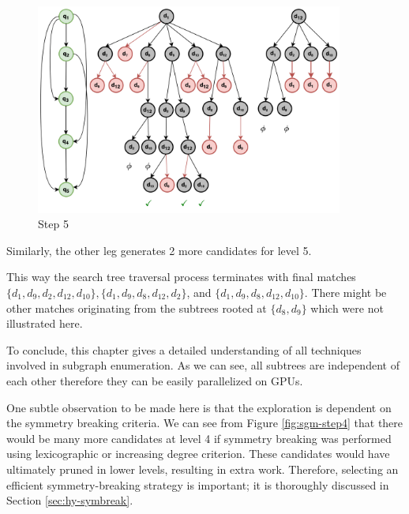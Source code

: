 \begin{enumerate}[Step 1:]
\begin{figure}
              \includegraphics[width=0.9\textwidth]{fig/LR/sgm-step5.png}
              \caption{Step 5}
              \label{fig:sgm-step5}
          \end{figure}
          Similarly, the other leg generates 2 more candidates for level 5.
\end{enumerate}
This way the search tree traversal process terminates with final matches
$\{d_1, d_9, d_2, d_{12}, d_{10} \}, \{d_1, d_9, d_8, d_{12}, d_2\}$, and $\{d_1, d_9, d_8, d_{12}, d_{10}\}$.
There might be other matches originating from the subtrees rooted at $\{d_8, d_9\}$ which were not illustrated here.

To conclude, this chapter gives a detailed understanding of all techniques involved in subgraph enumeration. As we can see, all subtrees are independent of each other therefore they can be easily parallelized on GPUs.

One subtle observation to be made here is that the exploration is dependent on the symmetry breaking criteria.
We can see from Figure \ref{fig:sgm-step4} that there would be many more candidates at level 4 if symmetry breaking was performed using lexicographic or increasing degree criterion.
These candidates would have ultimately pruned in lower levels, resulting in extra work.
Therefore, selecting an efficient symmetry-breaking strategy is important; it is thoroughly discussed in Section \ref{sec:hy-symbreak}.
